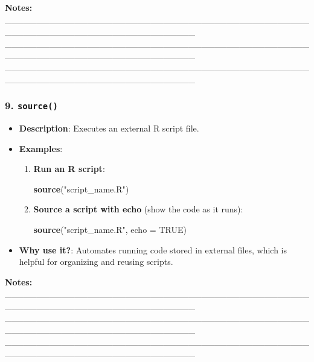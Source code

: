 \documentclass[
  11pt,
]{article}
\newenvironment{Shaded}{\begin{snugshade}}{\end{snugshade}}
\newcommand{\AttributeTok}[1]{\textcolor[rgb]{0.13,0.29,0.53}{#1}}
\newcommand{\ConstantTok}[1]{\textcolor[rgb]{0.56,0.35,0.01}{#1}}
\newcommand{\FunctionTok}[1]{\textcolor[rgb]{0.13,0.29,0.53}{\textbf{#1}}}
\newcommand{\NormalTok}[1]{#1}
\newcommand{\StringTok}[1]{\textcolor[rgb]{0.31,0.60,0.02}{#1}}
\providecommand{\tightlist}{%
  \setlength{\itemsep}{0pt}\setlength{\parskip}{0pt}}
\begin{document}
\textbf{Notes:}
\_\_\_\_\_\_\_\_\_\_\_\_\_\_\_\_\_\_\_\_\_\_\_\_\_\_\_\_\_\_\_\_\_\_\_\_\_\_\_\_\_\_\_\_\_\_\_\_\_\_\_\_\_\_\_\_\_\_\_\_\_\_\_\_\_\_\_\_\_\_\_\_\_\_\_\_\_\_
\_\_\_\_\_\_\_\_\_\_\_\_\_\_\_\_\_\_\_\_\_\_\_\_\_\_\_\_\_\_\_\_\_\_\_\_\_\_\_\_\_\_\_\_\_\_\_\_\_\_\_\_\_\_\_\_\_\_\_\_\_\_\_\_\_\_\_\_\_\_\_\_\_\_\_\_\_\_
\_\_\_\_\_\_\_\_\_\_\_\_\_\_\_\_\_\_\_\_\_\_\_\_\_\_\_\_\_\_\_\_\_\_\_\_\_\_\_\_\_\_\_\_\_\_\_\_\_\_\_\_\_\_\_\_\_\_\_\_\_\_\_\_\_\_\_\_\_\_\_\_\_\_\_\_\_\_

\subsubsection{\texorpdfstring{9.
\texttt{source()}}{9. source()}}\label{source}

\begin{itemize}
\tightlist
\item
  \textbf{Description}: Executes an external R script file.
\item
  \textbf{Examples}:

  \begin{enumerate}
  \def\labelenumi{\arabic{enumi}.}
  \item
    \textbf{Run an R script}:

\begin{Shaded}
\begin{Highlighting}[]
\FunctionTok{source}\NormalTok{(}\StringTok{"script\_name.R"}\NormalTok{)}
\end{Highlighting}
\end{Shaded}
  \item
    \textbf{Source a script with echo} (show the code as it runs):

\begin{Shaded}
\begin{Highlighting}[]
\FunctionTok{source}\NormalTok{(}\StringTok{"script\_name.R"}\NormalTok{, }\AttributeTok{echo =} \ConstantTok{TRUE}\NormalTok{)}
\end{Highlighting}
\end{Shaded}
  \end{enumerate}
\item
  \textbf{Why use it?}: Automates running code stored in external files,
  which is helpful for organizing and reusing scripts.
\end{itemize}

\textbf{Notes:}
\_\_\_\_\_\_\_\_\_\_\_\_\_\_\_\_\_\_\_\_\_\_\_\_\_\_\_\_\_\_\_\_\_\_\_\_\_\_\_\_\_\_\_\_\_\_\_\_\_\_\_\_\_\_\_\_\_\_\_\_\_\_\_\_\_\_\_\_\_\_\_\_\_\_\_\_\_\_
\_\_\_\_\_\_\_\_\_\_\_\_\_\_\_\_\_\_\_\_\_\_\_\_\_\_\_\_\_\_\_\_\_\_\_\_\_\_\_\_\_\_\_\_\_\_\_\_\_\_\_\_\_\_\_\_\_\_\_\_\_\_\_\_\_\_\_\_\_\_\_\_\_\_\_\_\_\_
\_\_\_\_\_\_\_\_\_\_\_\_\_\_\_\_\_\_\_\_\_\_\_\_\_\_\_\_\_\_\_\_\_\_\_\_\_\_\_\_\_\_\_\_\_\_\_\_\_\_\_\_\_\_\_\_\_\_\_\_\_\_\_\_\_\_\_\_\_\_\_\_\_\_\_\_\_\_
\end{document}
